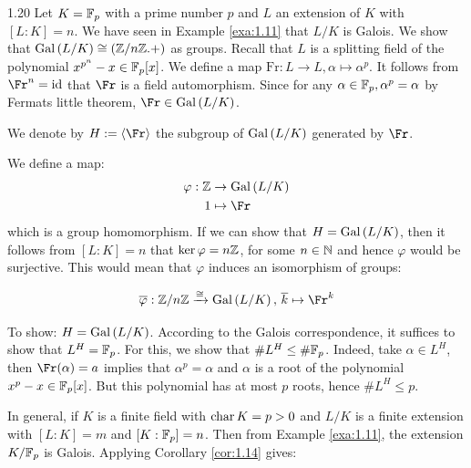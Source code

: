 \documentclass[twoside = false,	%
		headsepline,		%
		parskip = true,
		]{scrbook}						%
\begin{document}
    	\begin{example}{}{1.20}
    		Let $K= \mathbb F_p$ with a prime number $p$ and $L$ an extension of $K$ with $[L:K] = n$. We have seen in Example \ref{exa:1.11} that $L/K$ is Galois.
    		We show that $\mathrm{Gal}\left( L/K\right) \cong (\mathbb Z/n\mathbb Z.+)$ as groups.
    		Recall that $L$ is a splitting field of the polynomial $x^{p^n}-x \in \mathbb F_p[x]$. We define a map $\mathrm{Fr}: L \rightarrow L, \alpha \mapsto \alpha^p$. It follows from $\Fr^n = \id$ that $\Fr$ is a field automorphism. Since for any $\alpha \in \mathbb F_p, \alpha^p = \alpha$ by Fermats little theorem, $\Fr \in \Gal{L/K}$.
    		
    		We denote by $H:= \spitz{\Fr}$ the subgroup of $\mathrm{Gal}\left( L/K\right)$ generated by $\Fr$.
    		
    		We define a map:
    		\begin{equation*}
    			\begin{split}
    				\varphi: \Z &\rightarrow \Gal{L/K} \\
    						1 & \mapsto \Fr
    			\end{split}
    		\end{equation*}
    	which is a group homomorphism. If we can show that $H = \mathrm{Gal}\left( L/K\right)$, then it follows from $[L:K] = n$ that $\ker \varphi = n\mathbb Z$, for some $n \in \mathbb N$ and hence $\varphi$ would be surjective. This would mean that $\varphi$ induces an isomorphism of groups:
    	
    	\begin{equation*}
    		\overline{\varphi}: \Z/n\Z \xrightarrow{\cong} \Gal{L/K}, \, \overline{k} \mapsto \Fr^k
    	\end{equation*}
    	
    	To show: $H = \mathrm{Gal}\left( L/K\right)$. According to the Galois correspondence, it suffices to show that $L^H = \mathbb F_p$. For this, we show that $\#L^H \leq \# \mathbb F_p$. Indeed, take $\alpha \in L^H$, then $\Fr(\alpha) = a$ implies that $\alpha^p = \alpha$ and $\alpha$ is a root of the polynomial $x^p - x \in \mathbb F_p[x]$. But this polynomial has at most $p$ roots, hence $\# L^H \leq p$.
    	
    	In general, if $K$ is a finite field with $\mathrm{char} \, K = p > 0$ and $L/K$ is a finite extension with $[L:K] = m$ and $[K:\mathbb F_p] = n$. Then from Example \ref{exa:1.11}, the extension $K/\mathbb F_p$ is Galois. Applying Corollary \ref{cor:1.14} gives: %
    	

\end{example}
\end{document}
